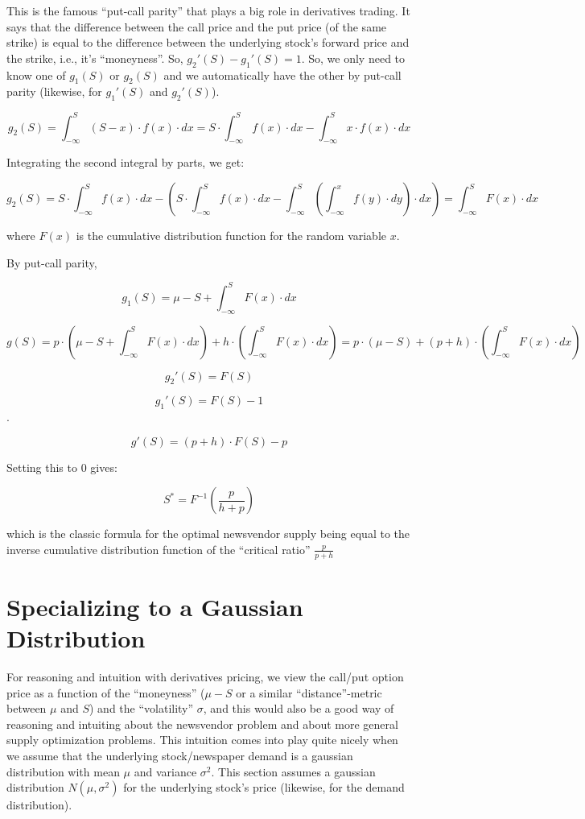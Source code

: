 \documentclass[11pt, oneside]{article}   	%
\begin{document}
This is the famous ``put-call parity'' that plays a big role in derivatives trading. It says that the difference between the call price and the put price (of the same strike) is equal to the difference between the underlying stock's forward price and the strike, i.e., it's ``moneyness''. So, $g_2'(S) - g_1'(S) = 1$. So, we only need to know one of $g_1(S)$ or $g_2(S)$ and we automatically have the other by put-call parity (likewise, for $g_1'(S)$ and $g_2'(S)$).

$$g_2(S) = \int_{-\infty}^S (S-x) \cdot f(x) \cdot dx = S \cdot \int_{-\infty}^S f(x) \cdot dx - \int_{-\infty}^S x \cdot f(x) \cdot dx$$

Integrating the second integral by parts, we get:

$$g_2(S) = S \cdot \int_{-\infty}^S f(x) \cdot dx - (S \cdot \int_{-\infty}^S f(x) \cdot dx - \int_{-\infty}^S (\int_{-\infty}^x f(y) \cdot dy) \cdot dx) = \int_{-\infty}^S F(x) \cdot dx$$

where $F(x)$ is the cumulative distribution function for the random variable $x$.

By put-call parity,

$$g_1(S) = \mu - S + \int_{-\infty}^S F(x) \cdot dx$$

$$g(S) = p \cdot (\mu - S + \int_{-\infty}^S F(x) \cdot dx) + h \cdot (\int_{-\infty}^S F(x) \cdot dx) = p \cdot (\mu - S) + (p + h) \cdot (\int_{-\infty}^S F(x) \cdot dx)$$

$$g_2'(S) = F(S)$$

$$g_1'(S) = F(S) - 1$$.

$$g'(S) = (p + h) \cdot F(S) - p$$

Setting this to 0 gives:

$$S^* = F^{-1}(\frac p {h + p})$$

which is the classic formula for the optimal newsvendor supply being equal to the inverse cumulative distribution function of the ``critical ratio'' $\frac p {p + h}$

\section{Specializing to a Gaussian Distribution}
For reasoning and intuition with derivatives pricing, we view the call/put option price as a function of the ``moneyness'' ($\mu - S$ or a similar ``distance''-metric between $\mu$ and $S$) and the ``volatility'' $\sigma$, and this would also be a good way of reasoning and intuiting about the newsvendor problem and about more general supply optimization problems. This intuition comes into play quite nicely when we assume that the underlying stock/newspaper demand is a gaussian distribution with mean $\mu$ and variance $\sigma^2$. This section assumes a gaussian distribution $N(\mu, \sigma^2)$ for the underlying stock's price (likewise, for the demand distribution). 
\end{document}
